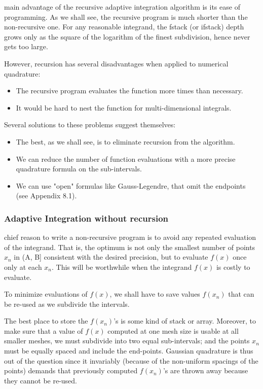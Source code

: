  main advantage of the recursive adaptive integration algorithm is its ease of programming. As we shall see, the recursive program is much shorter than the non-recursive one. For any reasonable integrand, the fstack (or ifstack) depth grows only as the square of the logarithm of the finest subdivision, hence never gets too large.

However, recursion has several disadvantages when applied to numerical quadrature:

\begin{itemize}
    \item The recursive program evaluates the function more times than necessary.
    \item It would be hard to nest the function  for multi-dimensional integrals.
\end{itemize}

Several solutions to these problems suggest themselves:
\begin{itemize}
    \item The best, as we shall see, is to eliminate recursion from the algorithm.
    \item We can reduce the number of function evaluations with a more precise quadrature formula on the sub-intervals.
    \item We can use "open" formulas like Gauss-Legendre, that omit the endpoints (see Appendix 8.1).
\end{itemize}

\subsubsection{Adaptive Integration without recursion}
 chief reason to write a non-recursive program is to avoid any repeated evaluation of the integrand. That is, the optimum
is not only the smallest number of points $x_n$ in (A, B] consistent with the desired precision, but to evaluate $f(x)$ once only at each $x_n$. This will be worthwhile when the integrand $f(x)$ is costly to evaluate.

To minimize evaluations of $f(x)$, we shall have to save values $f(x_n)$ that can be re-used as we subdivide the intervals.

The best place to store the $f(x_n)$’s is some kind of stack or array. Moreover, to make sure that a value of $f(x)$ computed at one mesh size is usable at all smaller meshes, we must subdivide into two equal sub-intervals; and the points $x_n$ must be equally spaced and include the end-points. Gaussian quadrature is thus out of the question since it invariably (because of the non-uniform spacings of the points) demands that previously computed $f(x_n)$’s are thrown away because they cannot be re-used.

